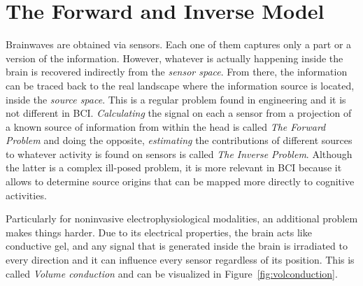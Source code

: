 \section{The Forward and Inverse Model}

Brainwaves are obtained via sensors. Each one of them captures only a part or a version of the information.  However, whatever is actually happening inside the brain is recovered indirectly from the \textit{sensor space}. From there, the information can be traced back to the real landscape where the information source is located, inside the \textit{source space}.  This is a regular problem found in engineering and it is not different in BCI.  \textit{Calculating} the signal on each a sensor from a projection of a known source of information from within the head is called \textit{The Forward Problem}\cite{Parra2008,WolpawJonathanR2012}  and doing the opposite, \textit{estimating} the contributions of different sources to whatever activity is found on sensors is called  \textit{The Inverse Problem}.  Although the latter is a complex ill-posed problem, it is more relevant in BCI because it allows to determine source origins that can be mapped more directly to cognitive activities. 

Particularly for noninvasive electrophysiological modalities, an additional problem makes things harder.  Due to its electrical properties, the brain acts like conductive gel, and any signal that is generated inside the brain is irradiated to every direction and it can influence every sensor regardless of its position.  This is called \textit{Volume conduction} \cite{Nam2018,Buzsaki2012} and can be visualized in Figure~\ref{fig:volconduction}.

